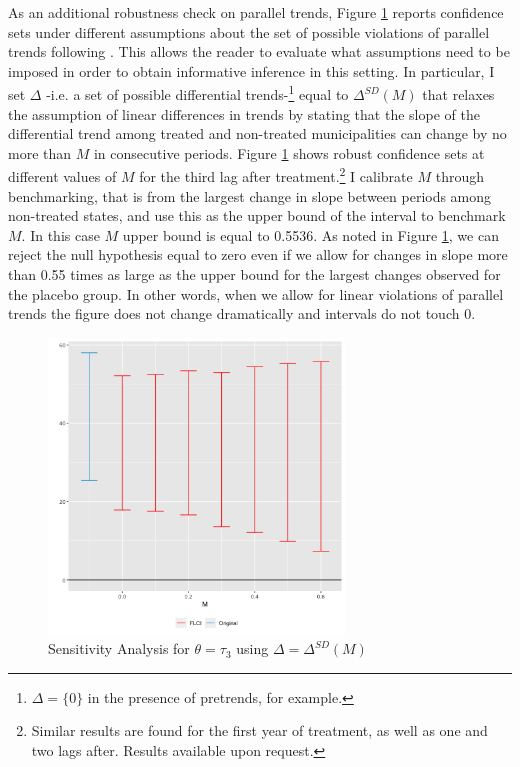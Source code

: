 \documentclass[12pt]{amsart}
\numberwithin{equation}{section}
\theoremstyle{definition}
\theoremstyle{definition}
\theoremstyle{definition}
\begin{document}
\begin{appendix}
As an additional robustness check on parallel trends, Figure \ref{fig:pretrends_sensitivity} reports confidence sets under different assumptions about the set of possible violations of parallel trends following \citet{rambachan_roth_2019}. This allows the reader to evaluate what assumptions need to be imposed in order to obtain informative inference in this setting. In particular, I set $\Delta$ -i.e. a set of possible differential trends-\footnote{$\Delta=\{0\}$ in the presence of pretrends, for example.} equal to $\Delta^{SD}(M)$ that relaxes the assumption of linear differences in trends by stating that the slope of the differential trend among treated and non-treated municipalities can change by no more than $M$ in consecutive periods. Figure \ref{fig:pretrends_sensitivity} shows robust confidence sets at different values of $M$ for the third lag after treatment.\footnote{Similar results are found for the first year of treatment, as well as one and two lags after. Results available upon request.} I calibrate $M$ through benchmarking, that is from the largest change in slope between periods among non-treated states, and use this as the upper bound of the interval to benchmark $M$. In this case $M$ upper bound is equal to 0.5536. As noted in Figure \ref{fig:pretrends_sensitivity}, we can reject the null hypothesis equal to zero even if we allow for changes in slope more than 0.55 times as large as the upper bound for the largest changes observed for the placebo group. In other words, when we allow for linear violations of parallel trends the figure does not change dramatically and intervals do not touch 0.  

\begin{figure}[!htbp]  
\centering
\caption{Sensitivity Analysis for $\theta=\tau_3$ using $\Delta = \Delta^{SD}(M)$} 
\label{fig:pretrends_sensitivity}

\includegraphics[width=0.7\textwidth]{Figures/pretrends_sensitivity.png}
       \captionsetup{justification=centering}
\bigskip  


\end{figure}
\end{appendix}
\end{document}
